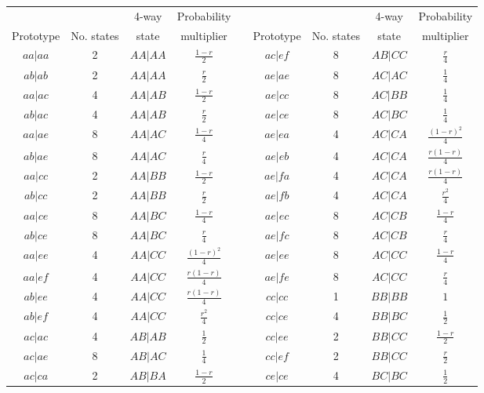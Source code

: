 \begin{center}\begin{tabular}{ccccccccc}\cline{1-4} \cline{6-9}
          &            & 4-way & Probability & &
          &            & 4-way & Probability \\[-6pt] 
Prototype & No. states & state & multiplier & \hspace{10mm} &
Prototype & No. states & state & multiplier \\ \cline{1-4} \cline{6-9}
$aa|aa$ & 2 & $AA|AA$ & $\frac{1-r}{2}$ &&
$ac|ef$ & 8 & $AB|CC$ & $\frac{r}{4}$ \\ 
$ab|ab$ & 2 & $AA|AA$ & $\frac{r}{2}$ &&
$ae|ae$ & 8 & $AC|AC$ & $\frac{1}{4}$ \\ 
$aa|ac$ & 4 & $AA|AB$ & $\frac{1-r}{2}$ &&
$ae|cc$ & 8 & $AC|BB$ & $\frac{1}{4}$ \\ 
$ab|ac$ & 4 & $AA|AB$ & $\frac{r}{2}$ &&
$ae|ce$ & 8 & $AC|BC$ & $\frac{1}{4}$ \\ 
$aa|ae$ & 8 & $AA|AC$ & $\frac{1-r}{4}$ &&
$ae|ea$ & 4 & $AC|CA$ & $\frac{(1-r)^2}{4}$ \\ 
$ab|ae$ & 8 & $AA|AC$ & $\frac{r}{4}$ &&
$ae|eb$ & 4 & $AC|CA$ & $\frac{r(1-r)}{4}$ \\ 
$aa|cc$ & 2 & $AA|BB$ & $\frac{1-r}{2}$ &&
$ae|fa$ & 4 & $AC|CA$ & $\frac{r(1-r)}{4}$ \\ 
$ab|cc$ & 2 & $AA|BB$ & $\frac{r}{2}$ &&
$ae|fb$ & 4 & $AC|CA$ & $\frac{r^2}{4}$ \\ 
$aa|ce$ & 8 & $AA|BC$ & $\frac{1-r}{4}$ &&
$ae|ec$ & 8 & $AC|CB$ & $\frac{1-r}{4}$ \\ 
$ab|ce$ & 8 & $AA|BC$ & $\frac{r}{4}$ &&
$ae|fc$ & 8 & $AC|CB$ & $\frac{r}{4}$ \\ 
$aa|ee$ & 4 & $AA|CC$ & $\frac{(1-r)^2}{4}$ &&
$ae|ee$ & 8 & $AC|CC$ & $\frac{1-r}{4}$ \\ 
$aa|ef$ & 4 & $AA|CC$ & $\frac{r(1-r)}{4}$ &&
$ae|fe$ & 8 & $AC|CC$ & $\frac{r}{4}$ \\ 
$ab|ee$ & 4 & $AA|CC$ & $\frac{r(1-r)}{4}$ &&
$cc|cc$ & 1 & $BB|BB$ & $1$ \\ 
$ab|ef$ & 4 & $AA|CC$ & $\frac{r^2}{4}$ &&
$cc|ce$ & 4 & $BB|BC$ & $\frac{1}{2}$ \\ 
$ac|ac$ & 4 & $AB|AB$ & $\frac{1}{2}$ &&
$cc|ee$ & 2 & $BB|CC$ & $\frac{1-r}{2}$ \\ 
$ac|ae$ & 8 & $AB|AC$ & $\frac{1}{4}$ &&
$cc|ef$ & 2 & $BB|CC$ & $\frac{r}{2}$ \\ 
$ac|ca$ & 2 & $AB|BA$ & $\frac{1-r}{2}$ &&
$ce|ce$ & 4 & $BC|BC$ & $\frac{1}{2}$ \\ 

\end{tabular}
\end{center}
